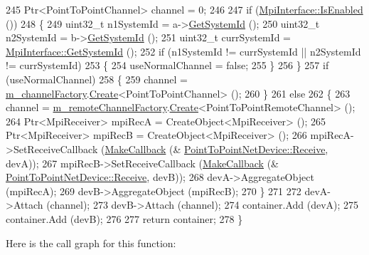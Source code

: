 \begin{DoxyCode}
245   Ptr<PointToPointChannel> channel = 0;
246 
247   \textcolor{keywordflow}{if} (\hyperlink{classns3_1_1MpiInterface_a5964beea2f60d6110bed18b14012e583}{MpiInterface::IsEnabled} ())
248     \{
249       uint32\_t n1SystemId = a->\hyperlink{classns3_1_1Node_a13740abb36295ad68e551de5b4e328d5}{GetSystemId} ();
250       uint32\_t n2SystemId = b->\hyperlink{classns3_1_1Node_a13740abb36295ad68e551de5b4e328d5}{GetSystemId} ();
251       uint32\_t currSystemId = \hyperlink{classns3_1_1MpiInterface_a7f1f671b55948fb1c8f7eb54f22a9619}{MpiInterface::GetSystemId} ();
252       \textcolor{keywordflow}{if} (n1SystemId != currSystemId || n2SystemId != currSystemId) 
253         \{
254           useNormalChannel = \textcolor{keyword}{false};
255         \}
256     \}
257   \textcolor{keywordflow}{if} (useNormalChannel)
258     \{
259       channel = \hyperlink{classns3_1_1PointToPointHelper_a1ba59f6f265fcda8868bd4d5891a1c72}{m\_channelFactory}.\hyperlink{classns3_1_1ObjectFactory_a18152e93f0a6fe184ed7300cb31e9896}{Create}<PointToPointChannel> ();
260     \}
261   \textcolor{keywordflow}{else}
262     \{
263       channel = \hyperlink{classns3_1_1PointToPointHelper_a96abd585304725f9ad2810503f795039}{m\_remoteChannelFactory}.\hyperlink{classns3_1_1ObjectFactory_a18152e93f0a6fe184ed7300cb31e9896}{Create}<PointToPointRemoteChannel> ();
264       Ptr<MpiReceiver> mpiRecA = CreateObject<MpiReceiver> ();
265       Ptr<MpiReceiver> mpiRecB = CreateObject<MpiReceiver> ();
266       mpiRecA->SetReceiveCallback (\hyperlink{group__makecallbackmemptr_ga9376283685aa99d204048d6a4b7610a4}{MakeCallback} (&
      \hyperlink{classns3_1_1PointToPointNetDevice_ac7d662e7083e3a522557fcfa502e4b5e}{PointToPointNetDevice::Receive}, devA));
267       mpiRecB->SetReceiveCallback (\hyperlink{group__makecallbackmemptr_ga9376283685aa99d204048d6a4b7610a4}{MakeCallback} (&
      \hyperlink{classns3_1_1PointToPointNetDevice_ac7d662e7083e3a522557fcfa502e4b5e}{PointToPointNetDevice::Receive}, devB));
268       devA->AggregateObject (mpiRecA);
269       devB->AggregateObject (mpiRecB);
270     \}
271 
272   devA->Attach (channel);
273   devB->Attach (channel);
274   container.Add (devA);
275   container.Add (devB);
276 
277   \textcolor{keywordflow}{return} container;
278 \}
\end{DoxyCode}


Here is the call graph for this function\+:


